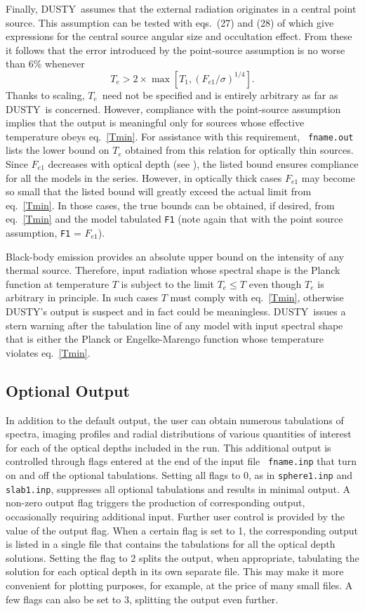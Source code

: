 \documentclass[12pt]{article} \usepackage{epsf}
\def\D  {{\sf DUSTY}}
\def\eq#1{\begin{equation} #1 \end{equation}}
\def\Te   {\hbox{$T_e$}}
\begin{document}
Finally, \D\ assumes that the external radiation originates in a central point
source. This assumption can be tested with eqs.\ (27) and (28) of \cite{IE97}
which give expressions for the central source angular size and occultation
effect. From these it follows that the error introduced by the point-source
assumption is no worse than 6\% whenever
\eq{\label{Tmin}
        T_e > 2\times\max[T_1, (F_{e1}/\sigma)^{1/4}].
}
Thanks to scaling, \Te\ need not be specified and is entirely arbitrary as far
as \D\ is concerned. However, compliance with the point-source assumption
implies that the output is meaningful only for sources whose effective
temperature obeys eq.\ \ref{Tmin}. For assistance with this requirement, {\tt
fname.out} lists the lower bound on $T_e$ obtained from this relation for
optically thin sources. Since $F_{e1}$ decreases with optical depth (see
\cite{IE97}), the listed bound ensures compliance for all the models in the
series. However, in optically thick cases $F_{e1}$ may become so small that the
listed bound will greatly exceed the actual limit from eq.\ \ref{Tmin}. In
those cases, the true bounds can be obtained, if desired, from eq.\ \ref{Tmin}
and the model tabulated {\tt F1} (note again that with the point source
assumption, {\tt F1} = $F_{e1}$).

Black-body emission provides an absolute upper bound on the intensity of any
thermal source. Therefore, input radiation whose spectral shape is the Planck
function at temperature $T$ is subject to the limit $T_e \le T$ even though
$T_e$ is arbitrary in principle. In such cases $T$ must comply with eq.\
\ref{Tmin}, otherwise \D's output is suspect and in fact could be meaningless.
\D\ issues a stern warning after the tabulation line of any model with input
spectral shape that is either the Planck or Engelke-Marengo function whose
temperature violates eq.\ \ref{Tmin}.

\subsection{Optional Output}
\label{Optional Output}

In addition to the default output, the user can obtain numerous tabulations of
spectra, imaging profiles and radial distributions of various quantities of
interest for each of the optical depths included in the run. This additional
output is controlled through flags entered at the end of the input file {\tt
fname.inp} that turn on and off the optional tabulations.  Setting all flags to
0, as in {\tt sphere1.inp} and {\tt slab1.inp}, suppresses all optional
tabulations and results in minimal output. A non-zero output flag triggers the
production of corresponding output, occasionally requiring additional input.
Further user control is provided by the value of the output flag. When a
certain flag is set to 1, the corresponding output is listed in a single file
that contains the tabulations for all the optical depth solutions. Setting the
flag to 2 splits the output, when appropriate, tabulating the solution for each
optical depth in its own separate file. This may make it more convenient for
plotting purposes, for example, at the price of many small files.  A few flags
can also be set to 3, splitting the output even further.
\end{document}
